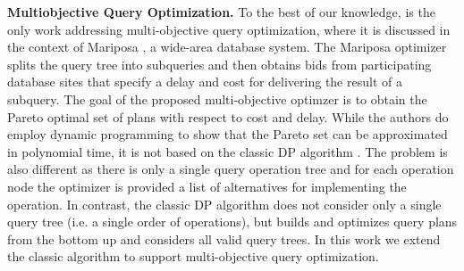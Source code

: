 \textbf{Multiobjective Query Optimization.} To the best of our
knowledge, \cite{papadimitriou_multiobjective_2001} is the only work
addressing multi-objective query optimization, where it is discussed
in the context of Mariposa \cite{stonebraker_mariposa:_1996}, a
wide-area database system. The Mariposa optimizer splits the query
tree into subqueries and then obtains bids from participating database
sites that specify a delay and cost for delivering the result of a
subquery. The goal of the proposed multi-objective optimzer
\cite{papadimitriou_multiobjective_2001} is to obtain the Pareto
optimal set of plans with respect to cost and delay. While the authors
do employ dynamic programming to show that the Pareto set can be
approximated in polynomial time, it is not based on the classic DP
algorithm \cite{selinger_access_1979}. The problem is also different
as there is only a single query operation tree and for each operation
node the optimizer is provided a list of alternatives for implementing
the operation. In contrast, the classic DP algorithm does not consider
only a single query tree (i.e. a single order of operations), but
builds and optimizes query plans from the bottom up and considers all
valid query trees. In this work we extend the classic algorithm to
support multi-objective query optimization.












